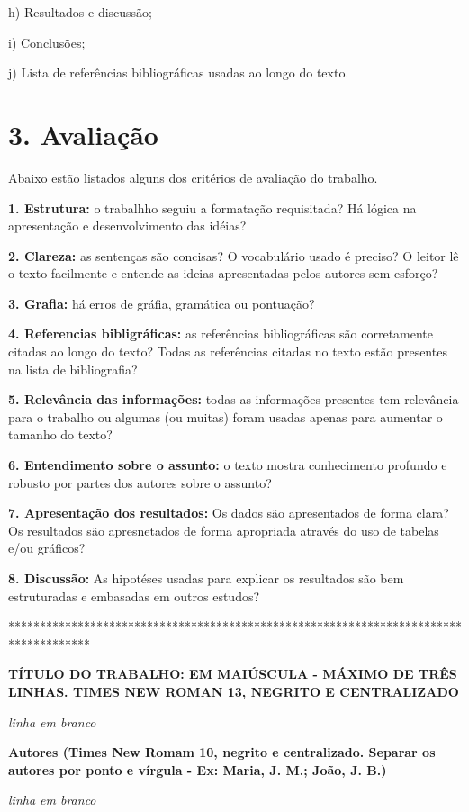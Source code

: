 \documentclass[a4paper,10pt]{article}
\begin{document}
    h) Resultados e discussão;
    
    i) Conclusões;
        
    j) Lista de referências bibliográficas usadas ao longo do texto. 
  
   \section* {3. Avaliação}
   \noindent
   
    Abaixo estão listados alguns dos critérios de avaliação do trabalho.
    
    \textbf{1. Estrutura:} o trabalhho seguiu a formatação requisitada? Há lógica na apresentação e desenvolvimento das idéias? 
    
    \textbf{2. Clareza:} as sentenças são concisas? O vocabulário usado é preciso? O leitor lê o texto facilmente e entende as ideias apresentadas pelos autores sem esforço?
    
    \textbf{3. Grafia:} há erros de gráfia, gramática ou pontuação? 
    
    \textbf{4. Referencias bibligráficas:} as referências bibliográficas são corretamente citadas ao longo do texto? Todas as referências citadas no texto estão presentes na lista de bibliografia? 
    
    \textbf{5. Relevância das informações:} todas as informações presentes tem relevância para o trabalho ou algumas (ou muitas) foram usadas apenas para aumentar o tamanho do texto? 
    
    \textbf{6. Entendimento sobre o assunto:} o texto mostra conhecimento profundo e robusto por partes dos autores sobre o assunto? 
    
    \textbf{7. Apresentação dos resultados:} Os dados são apresentados de forma clara? Os resultados são apresnetados de forma apropriada através do uso de tabelas e/ou gráficos? 

    \textbf{8. Discussão:} As hipotéses usadas para explicar os resultados são bem estruturadas e embasadas em outros estudos? 
    
\vspace{10ex}

*************************************************************************************

  {\centering
  \textbf{TÍTULO DO TRABALHO: EM MAIÚSCULA - MÁXIMO DE TRÊS LINHAS. TIMES NEW ROMAN 13, NEGRITO E  CENTRALIZADO}
  
  \textit{linha em branco}
  
  \textbf{Autores (Times New Romam 10, negrito e centralizado. Separar os autores por ponto e vírgula - Ex: Maria, J. M.; João, J. B.)}
  
  \textit{linha em branco}
  
  \par
  }
  
\end{document}
